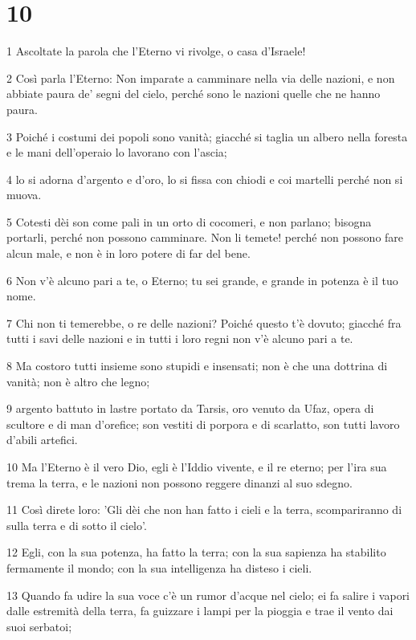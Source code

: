 \chapter{10}

\par 1 Ascoltate la parola che l'Eterno vi rivolge, o casa d'Israele!
\par 2 Così parla l'Eterno: Non imparate a camminare nella via delle nazioni, e non abbiate paura de' segni del cielo, perché sono le nazioni quelle che ne hanno paura.
\par 3 Poiché i costumi dei popoli sono vanità; giacché si taglia un albero nella foresta e le mani dell'operaio lo lavorano con l'ascia;
\par 4 lo si adorna d'argento e d'oro, lo si fissa con chiodi e coi martelli perché non si muova.
\par 5 Cotesti dèi son come pali in un orto di cocomeri, e non parlano; bisogna portarli, perché non possono camminare. Non li temete! perché non possono fare alcun male, e non è in loro potere di far del bene.
\par 6 Non v'è alcuno pari a te, o Eterno; tu sei grande, e grande in potenza è il tuo nome.
\par 7 Chi non ti temerebbe, o re delle nazioni? Poiché questo t'è dovuto; giacché fra tutti i savi delle nazioni e in tutti i loro regni non v'è alcuno pari a te.
\par 8 Ma costoro tutti insieme sono stupidi e insensati; non è che una dottrina di vanità; non è altro che legno;
\par 9 argento battuto in lastre portato da Tarsis, oro venuto da Ufaz, opera di scultore e di man d'orefice; son vestiti di porpora e di scarlatto, son tutti lavoro d'abili artefici.
\par 10 Ma l'Eterno è il vero Dio, egli è l'Iddio vivente, e il re eterno; per l'ira sua trema la terra, e le nazioni non possono reggere dinanzi al suo sdegno.
\par 11 Così direte loro: 'Gli dèi che non han fatto i cieli e la terra, scompariranno di sulla terra e di sotto il cielo'.
\par 12 Egli, con la sua potenza, ha fatto la terra; con la sua sapienza ha stabilito fermamente il mondo; con la sua intelligenza ha disteso i cieli.
\par 13 Quando fa udire la sua voce c'è un rumor d'acque nel cielo; ei fa salire i vapori dalle estremità della terra, fa guizzare i lampi per la pioggia e trae il vento dai suoi serbatoi;
